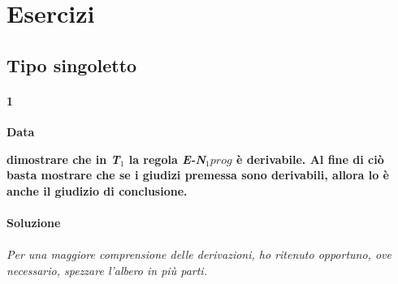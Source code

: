 \documentclass[10pt,a4paper, italian]{book}
\begin{document}
{{{ 



\section{Esercizi}
\label{sec:esercizi-cap2}
\subsection{Tipo singoletto}
\label{subsec: tipo-singoletto}
\paragraph{1} 
\textbf{Data}
\begin{prooftree}
\end{prooftree}
\textbf{dimostrare che in \textit{T$_1$} la regola \textit{E-N$_1prog$} \`e derivabile. Al fine di ci\`o basta mostrare che se i giudizi premessa sono derivabili, allora lo \`e anche il giudizio di conclusione.}\\\\
\textbf{Soluzione}\\\\
\textit{Per una maggiore comprensione delle derivazioni, ho ritenuto opportuno, ove necessario, spezzare l'albero in pi\`u parti.}

}}}
\end{document}
